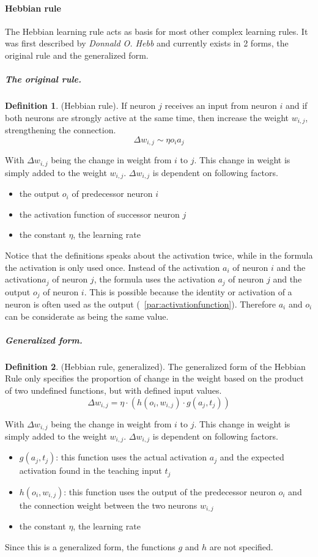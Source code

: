 \documentclass[pdftex,a4paper,12pt,twoside]{report}
\theoremstyle{plain} \newtheorem{theorem}{Theorem} \newtheorem{proposition}{Proposition} \newtheorem{lemma}{Lemma} \newtheorem*{corollary}{Corollary}
\theoremstyle{definition} \newtheorem{definition}{Definition} \newtheorem{conjecture}{Conjecture} \newtheorem*{example}{Example} \newtheorem{algorithm}{Algorithm}
\theoremstyle{remark} \newtheorem*{remark}{Remark} \newtheorem*{note}{Note} \newtheorem{case}{Case}
\begin{document}
\paragraph{Hebbian rule}
The Hebbian learning rule acts as basis for most other complex learning rules. It was first described by \emph{Donnald O. Hebb} \citep{Hebb1949} and currently exists in 2 forms, the original rule and the generalized form.
\subparagraph{The original rule.}
\begin{definition}
(Hebbian rule). If neuron $j$ receives an input from neuron $i$ and if both neurons are strongly active at the same time, then increase the weight $w_{i,j}$, strengthening the connection.
\begin{equation}
\Delta w_{i,j} \sim \eta o_ia_j
\end{equation}
\end{definition}
With $\Delta w_{i,j}$ being the change in weight from $i$ to $j$. This change in weight is simply added to the weight $w_{i,j}$. $\Delta w_{i,j}$ is dependent on following factors.
\begin{itemize}
\item the output $o_i$ of predecessor neuron $i$
\item the activation function of successor neuron $j$
\item the constant $\eta$, the learning rate
\end{itemize}
Notice that the definitions speaks about the activation twice, while in the formula the activation is only used once. Instead of the activation $a_i$ of neuron $i$ and the activation$a_j$ of neuron $j$, the formula uses the activation $a_j$ of neuron $j$ and the output $o_j$ of neuron $i$. This is possible because the identity or activation of a neuron is often used as the output (~\ref{par:activationfunction}). Therefore $a_i$ and $o_i$ can be considerate as being the same value.
\subparagraph{Generalized form.}
\begin{definition}
(Hebbian rule, generalized). The generalized form of the Hebbian Rule only specifies the proportion of change in the weight based on the product of two undefined functions, but with defined input values.
\begin{equation}
\Delta w_{i,j} = \eta \cdot (h(o_i,w_{i,j}) \cdot g(a_j,t_j))
\end{equation}
\end{definition}
\label{equa:generalizedHebbian}
With $\Delta w_{i,j}$ being the change in weight from $i$ to $j$. This change in weight is simply added to the weight $w_{i,j}$. $\Delta w_{i,j}$ is dependent on following factors.
\begin{itemize}
\item $g(a_j,t_j)$: this function uses the actual activation $a_j$ and the expected activation found in the teaching input $t_j$
\item $h(o_i,w_{i,j})$: this function uses the output of the predecessor neuron $o_i$ and the connection weight between the two neurons $w_{i,j}$
\item the constant $\eta$, the learning rate
\end{itemize}
Since this is a generalized form, the functions $g$ and $h$ are not specified.
\end{document}
